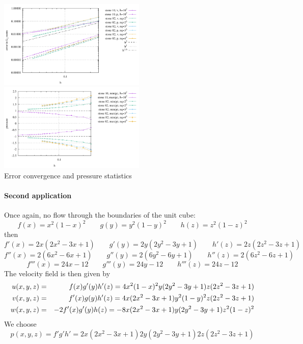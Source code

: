 \begin{center}
\includegraphics[width=7cm]{images/mms/generic3D/conv.pdf}
\includegraphics[width=7cm]{images/mms/generic3D/p_stats.pdf}\\
{\captionfont Error convergence and pressure statistics}
\end{center}

\paragraph{Second application}

Once again, no flow through the boundaries of the unit cube:
\[
f(x)=x^2(1-x)^2 \qquad
g(y)=y^2(1-y)^2 \qquad
h(z)=z^2(1-z)^2 
\]
then 
\[
f'(x)=2x(2x^2-3x+1) \qquad
g'(y)=2y(2y^2-3y+1) \qquad
h'(z)=2z(2z^2-3z+1) 
\]
\[
f''(x)=2(6x^2-6x+1) \qquad
g''(y)=2(6y^2-6y+1) \qquad
h''(z)=2(6z^2-6z+1)
\]
\[
f'''(x)=24x-12 \qquad
g'''(y)=24y-12 \qquad
h'''(z)=24z-12
\]
The velocity field is then given by
\begin{eqnarray}
u(x,y,z) 
&=& f(x) g'(y) h'(z) 
= 4 x^2(1-x)^2  y(2y^2-3y+1) z(2z^2-3z+1)  \nonumber\\
v(x,y,z) 
&=& f'(x) g(y) h'(z) 
= 4 x(2x^2-3x+1) y^2(1-y)^2 z(2z^2-3z+1) \nonumber\\
w(x,y,z) 
&=& -2f'(x) g'(y) h(z) 
= -8 x(2x^2-3x+1) y(2y^2-3y+1) z^2(1-z)^2 
\end{eqnarray}
We choose
\[
p(x,y,z)=f'g'h' = 2x(2x^2-3x+1)  2y(2y^2-3y+1)  2z(2z^2-3z+1) 
\]













